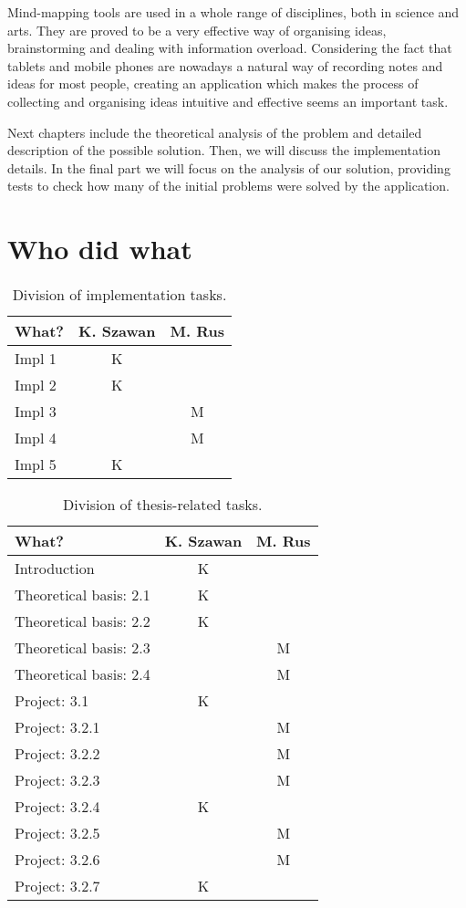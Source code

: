 
Mind-mapping tools are used in a whole range of disciplines, both in science and arts. They are proved to be a very effective way of organising ideas, brainstorming and dealing with information overload. Considering the fact that tablets and mobile phones are nowadays a natural way of recording notes and ideas for most people, creating an application which makes the process of collecting and organising ideas intuitive and effective seems an important task.


Next chapters include the theoretical analysis of the problem and detailed description of the possible solution. Then, we will discuss the implementation details. In the final part we will focus on the analysis of our solution, providing tests to check how many of the initial problems were solved by the application.

\section{Who did what}
\label{sec:who-did-what}


\begin{table}[h]
	\centering
	\begin{tabular}{l|c|c}
		What? & K. Szawan & M. Rus \\
		\hline
		Impl 1 & K & \\
		Impl 2 & K & \\
		Impl 3 & & M\\
		Impl 4 & & M\\
		Impl 5 & K & \\
	\end{tabular}
	\caption{Division of implementation tasks.}
	\label{tab:who-did-impl}
\end{table}

\begin{table}[h]
	\centering
	\begin{tabular}{l|c|c}
		What? & K. Szawan & M. Rus \\
		\hline
		Introduction & K & \\
		Theoretical basis: 2.1 & K & \\
		Theoretical basis: 2.2 & K & \\
		Theoretical basis: 2.3 &  & M \\
		Theoretical basis: 2.4 &  & M \\
		Project: 3.1  & K  &  \\
		Project: 3.2.1  &   & M \\
		Project: 3.2.2  &   & M \\
		Project: 3.2.3  &   & M \\
		Project: 3.2.4  & K  &  \\
		Project: 3.2.5  &   & M \\
		Project: 3.2.6  &   & M \\		
		Project: 3.2.7  & K  &  \\
	\end{tabular}
	\caption{Division of thesis-related tasks.}
	\label{tab:who-did-docs}
\end{table}
